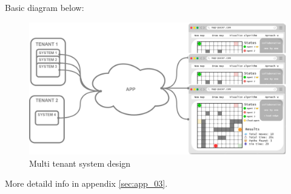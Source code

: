 Basic diagram below:
\begin{figure}[H]
    \centering
    \includegraphics[width=\textwidth]{pictures/multi_tenant_simple.png}
    \caption{ Multi tenant system design }
    \label{fig:multi_tenant_simple}
\end{figure}

More detaild info in appendix \ref{sec:app_03}.